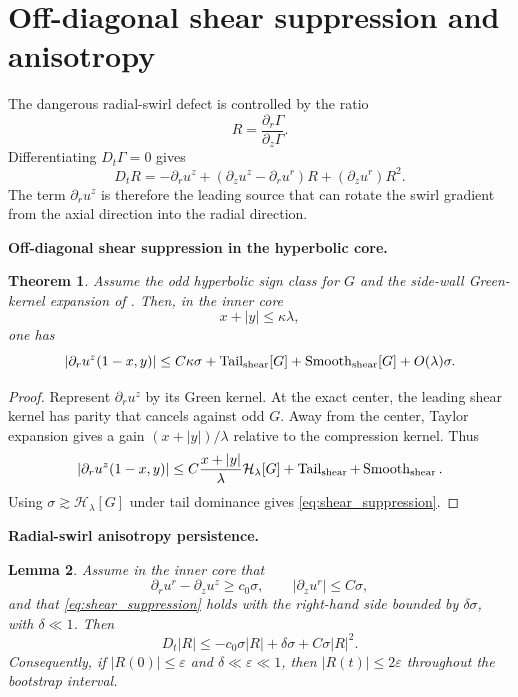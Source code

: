 \documentclass[11pt]{amsart}
\newtheorem{theorem}{Theorem}[section]
\newtheorem{lemma}[theorem]{Lemma}
\begin{document}
\section{Off-diagonal shear suppression and anisotropy}

The dangerous radial-swirl defect is controlled by the ratio
\begin{equation}\label{eq:R_def}
R=\frac{\partial_r\Gamma}{\partial_z\Gamma}.
\end{equation}
Differentiating \(D_t\Gamma=0\) gives
\begin{equation}\label{eq:R_eq}
D_tR
=
-\partial_r u^z
+
(\partial_z u^z-\partial_r u^r)R
+
(\partial_z u^r)R^2.
\end{equation}
The term \(\partial_r u^z\) is therefore the leading source that can rotate the swirl gradient from the axial direction into the radial direction.

\medskip
\noindent\textbf{Off-diagonal shear suppression in the hyperbolic core.}
\begin{theorem}\label{thm:shear_suppression}
Assume the odd hyperbolic sign class for \(G\) and the side-wall Green-kernel expansion of .  Then, in the inner core
\[
x+|y|\le\kappa\lambda,
\]
one has
\begin{equation}\label{eq:shear_suppression}
|\partial_r u^z(1-x,y)|
\le
C\kappa\sigma
+
\operatorname{Tail}_{\rm shear}[G]
+
\operatorname{Smooth}_{\rm shear}[G]
+
O(\lambda)\sigma.
\end{equation}
\end{theorem}

\begin{proof}
Represent \(\partial_r u^z\) by its Green kernel.  At the exact center, the leading shear kernel has parity that cancels against odd \(G\).  Away from the center, Taylor expansion gives a gain \((x+|y|)/\lambda\) relative to the compression kernel.  Thus
\[
|\partial_r u^z(1-x,y)|
\le
C\frac{x+|y|}{\lambda}\mathcal H_\lambda[G]
+
\operatorname{Tail}_{\rm shear}
+
\operatorname{Smooth}_{\rm shear}.
\]
Using \(\sigma\gtrsim\mathcal H_\lambda[G]\) under tail dominance gives \eqref{eq:shear_suppression}.
\end{proof}

\medskip
\noindent\textbf{Radial-swirl anisotropy persistence.}
\begin{lemma}\label{lem:anisotropy}
Assume in the inner core that
\[
\partial_r u^r-\partial_z u^z\ge c_0\sigma,
\qquad
|\partial_z u^r|\le C\sigma,
\]
and that \eqref{eq:shear_suppression} holds with the right-hand side bounded by \(\delta\sigma\), with \(\delta\ll1\).  Then
\[
D_t|R|
\le
-c_0\sigma|R|
+
\delta\sigma
+C\sigma|R|^2.
\]
Consequently, if \(|R(0)|\le\varepsilon\) and \(\delta\ll\varepsilon\ll1\), then \(|R(t)|\le2\varepsilon\) throughout the bootstrap interval.
\end{lemma}
\end{document}
